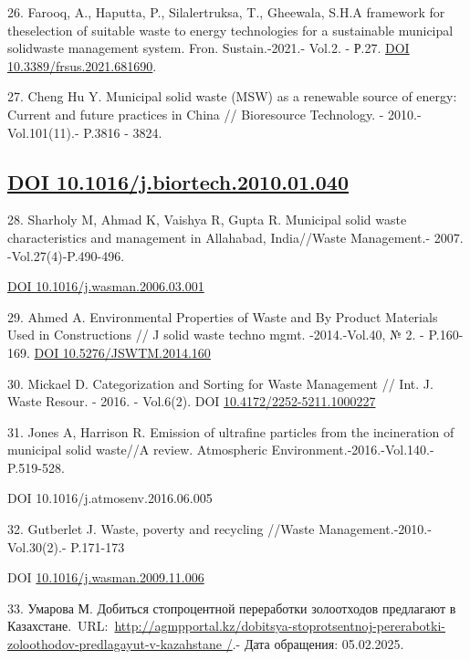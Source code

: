 \begin{references}
26. Farooq, A., Haputta, P., Silalertruksa, T., Gheewala, S.H.A
framework for theselection of suitable waste to energy technologies for
a sustainable municipal solidwaste management system. Fron.
Sustain.-2021.- Vol.2. - Р.27.
\href{https://doi.org/10.3389/frsus.2021.681690}{DOI
10.3389/frsus.2021.681690}.

27. Cheng Hu Y. Municipal solid waste (MSW) as a renewable source of
energy: Current and future practices in China // Bioresource Technology.
- 2010.-Vol.101(11).- P.3816 - 3824.

\subsection{\texorpdfstring{\href{https://doi.org/10.1016/j.biortech.2010.01.040}{DOI
10.1016/j.biortech.2010.01.040}}{DOI 10.1016/j.biortech.2010.01.040}}\label{doi-10.1016j.biortech.2010.01.040}

28. Sharholy M, Ahmad K, Vaishya R, Gupta R. Municipal solid waste
characteristics and management in Allahabad, India//Waste Management.-
2007. -Vol.27(4)-P.490-496.

\href{https://doi.org/10.1016/j.wasman.2006.03.001}{DOI
10.1016/j.wasman.2006.03.001}

29. Ahmed A. Environmental Properties of Waste and By Product Materials
Used in Constructions // J solid waste techno mgmt. -2014.-Vol.40, № 2.
- P.160-169. \href{https://doi.org/10.5276/JSWTM.2014.160}{DOI
10.5276/JSWTM.2014.160}

30. Mickael D. Categorization and Sorting for Waste Management // Int.
J. Waste Resour. - 2016. - Vol.6(2). DOI
\href{http://dx.doi.org/10.4172/2252-5211.1000227}{10.4172/2252-5211.1000227}

31. Jones A, Harrison R. Emission of ultrafine particles from the
incineration of municipal solid waste//A review. Atmospheric
Environment.-2016.-Vol.140.-P.519-528.

DOI 10.1016/j.atmosenv.2016.06.005

32. Gutberlet J. Waste, poverty and recycling //Waste
Management.-2010.-Vol.30(2).- P.171-173

DOI
\href{http://dx.doi.org/10.1016/j.wasman.2009.11.006}{10.1016/j.wasman.2009.11.006}

33. Умарова М. Добиться стопроцентной переработки золоотходов предлагают
в
Казахстане.~URL:~\href{http://agmpportal.kz/dobitsya-stoprotsentnoj-pererabotki-zoloothodov-predlagayut-v-kazahstane\%20/}{http://agmpportal.kz/dobitsya-stoprotsentnoj-pererabotki-zoloothodov-predlagayut-v-kazahstane
/}.- Дата обращения: 05.02.2025.


\end{references}
